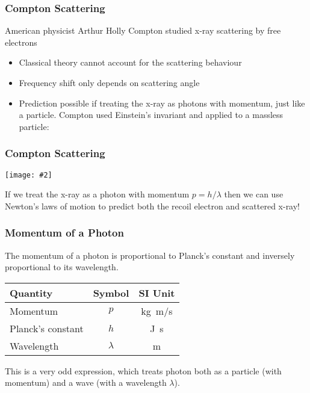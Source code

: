 \documentclass[12pt,compress,aspectratio=169]{beamer}
\newcommand{\pic}[2]{\texttt{[image: \#2]}}
\newcommand{\eq}[2]{\vspace{#1}{\Large\begin{displaymath}#2\end{displaymath}}}
\begin{document}
\begin{frame}
  \frametitle{Compton Scattering}
  American physicist Arthur Holly Compton studied x-ray scattering by free
  electrons
  \begin{itemize}
  \item Classical theory cannot account for the scattering behaviour
  \item Frequency shift only depends on scattering angle
  \item Prediction possible if treating the x-ray as photons with
    momentum, just like a particle. Compton used Einstein's invariant and
    applied to a massless particle:
  \end{itemize}

  \eq{-.3in}{
    \boxed{p=\frac{E}{c}=\frac{hf}{c}=\frac{h}{\lambda}}
  }
\end{frame}

\begin{frame}
  \frametitle{Compton Scattering}
  \begin{center}
    \pic{.5}{compton2.png}
  \end{center}
  If we treat the x-ray as a photon with momentum $p=h/\lambda$ then we can
  use Newton's laws of motion to predict both the recoil electron and scattered
  x-ray!
\end{frame}

\begin{frame}
  \frametitle{Momentum of a Photon}
  The momentum of a photon is proportional to Planck's constant and 
  inversely proportional to its wavelength.

  \eq{-.2in}{
    \boxed{p=\frac{h}{\lambda}}
  }
  \begin{center}
    \begin{tabular}{l|c|c}
      \rowcolor{pink}
      \textbf{Quantity} & \textbf{Symbol} & \textbf{SI Unit} \\ \hline
      Momentum          & $p$ & \si{\kilo\gram.\metre/\second}\\
      Planck's constant & $h$ & \si{\joule.\second}\\
      Wavelength        & $\lambda$ & \si{\metre}
    \end{tabular}
  \end{center}
  This is a very odd expression, which treats photon both as a particle (with
  momentum) and a wave (with a wavelength $\lambda$).
\end{frame}

\end{document}
